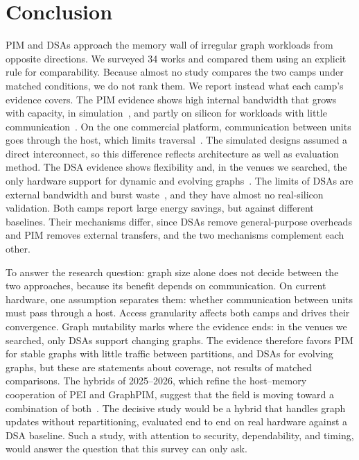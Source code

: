\documentclass[journal,onecolumn]{IEEEtran}
\begin{document}
\section{Conclusion}
PIM and DSAs approach the memory wall of irregular graph workloads from opposite directions. We surveyed 34 works and compared them using an explicit rule for comparability. Because almost no study compares the two camps under matched conditions, we do not rank them. We report instead what each camp's evidence covers. The PIM evidence shows high internal bandwidth that grows with capacity, in simulation~\cite{ahn2015tesseract,zhuo2019graphq}, and partly on silicon for workloads with little communication~\cite{gomezluna2022prim,cai2024pimpam}. On the one commercial platform, communication between units goes through the host, which limits traversal~\cite{gomezluna2022prim,barkhordar2025alphapim}. The simulated designs assumed a direct interconnect, so this difference reflects architecture as well as evaluation method. The DSA evidence shows flexibility and, in the venues we searched, the only hardware support for dynamic and evolving graphs~\cite{rahman2021jetstream,zhao2022tdgraph,gao2023mega}. The limits of DSAs are external bandwidth and burst waste~\cite{shin2025piccolo,orenesvera2023dalorex}, and they have almost no real-silicon validation. Both camps report large energy savings, but against different baselines. Their mechanisms differ, since DSAs remove general-purpose overheads and PIM removes external transfers, and the two mechanisms complement each other.

To answer the research question: graph size alone does not decide between the two approaches, because its benefit depends on communication. On current hardware, one assumption separates them: whether communication between units must pass through a host. Access granularity affects both camps and drives their convergence. Graph mutability marks where the evidence ends: in the venues we searched, only DSAs support changing graphs. The evidence therefore favors PIM for stable graphs with little traffic between partitions, and DSAs for evolving graphs, but these are statements about coverage, not results of matched comparisons. The hybrids of 2025--2026, which refine the host--memory cooperation of PEI and GraphPIM, suggest that the field is moving toward a combination of both~\cite{ahn2015pei,nai2017graphpim,shin2025piccolo,shin2025fala,yenimol2026cograf}. The decisive study would be a hybrid that handles graph updates without repartitioning, evaluated end to end on real hardware against a DSA baseline. Such a study, with attention to security, dependability, and timing, would answer the question that this survey can only ask.





\end{document}
